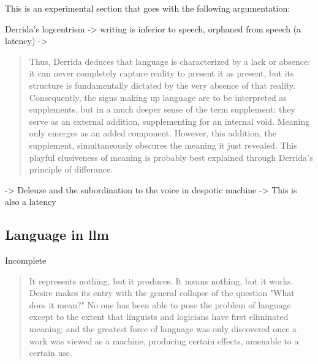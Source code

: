 \begin{orangebox}
	This is an experimental section that goes with the following argumentation:

	Derrida's logcentrism -> writing is inferior to speech, orphaned from speech (a
	latency) ->

	\begin{quote}
		Thus, Derrida deduces that language is characterized by a lack or absence: it can never completely capture reality to present it as present, but its structure is fundamentally dictated by the very absence of that reality. Consequently, the signs making up language are to be interpreted as supplements, but in a much deeper sense of the term supplement: they serve as an external addition, supplementing for an internal void. Meaning only emerges as an added component. However, this addition, the supplement, simultaneously obscures the meaning it just revealed. This playful elusiveness of meaning is probably best explained through Derrida’s principle of differance. \parencite[8]{maas2023}
	\end{quote}

	-> Deleuze and the subordination to the voice in despotic machine -> This is
	also a latency
\end{orangebox}



\subsection{Language in \Gls{llm} }
\begin{orangebox}
	Incomplete
\end{orangebox}




\begin{quote}
	It represents nothing, but it produces. It means nothing, but it works.
	Desire makes its entry with the general collapse of the question "What does
	it mean?" No one has been able to pose the problem of language except to the
	extent that linguists and logicians have first eliminated meaning; and the
	greatest force of language was only discovered once a work was viewed as a
	machine, producing certain effects, amenable to a certain use.
	\cite[109]{deleuze1983}
\end{quote}


